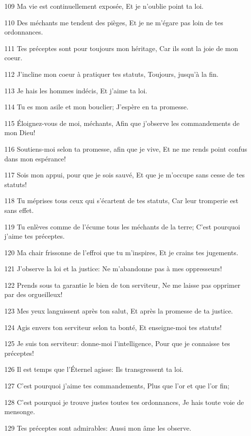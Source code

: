 \par 109 Ma vie est continuellement exposée, Et je n'oublie point ta loi.
\par 110 Des méchants me tendent des pièges, Et je ne m'égare pas loin de tes ordonnances.
\par 111 Tes préceptes sont pour toujours mon héritage, Car ils sont la joie de mon coeur.
\par 112 J'incline mon coeur à pratiquer tes statuts, Toujours, jusqu'à la fin.
\par 113 Je hais les hommes indécis, Et j'aime ta loi.
\par 114 Tu es mon asile et mon bouclier; J'espère en ta promesse.
\par 115 Éloignez-vous de moi, méchants, Afin que j'observe les commandements de mon Dieu!
\par 116 Soutiens-moi selon ta promesse, afin que je vive, Et ne me rends point confus dans mon espérance!
\par 117 Sois mon appui, pour que je sois sauvé, Et que je m'occupe sans cesse de tes statuts!
\par 118 Tu méprises tous ceux qui s'écartent de tes statuts, Car leur tromperie est sans effet.
\par 119 Tu enlèves comme de l'écume tous les méchants de la terre; C'est pourquoi j'aime tes préceptes.
\par 120 Ma chair frissonne de l'effroi que tu m'inspires, Et je crains tes jugements.
\par 121 J'observe la loi et la justice: Ne m'abandonne pas à mes oppresseurs!
\par 122 Prends sous ta garantie le bien de ton serviteur, Ne me laisse pas opprimer par des orgueilleux!
\par 123 Mes yeux languissent après ton salut, Et après la promesse de ta justice.
\par 124 Agis envers ton serviteur selon ta bonté, Et enseigne-moi tes statuts!
\par 125 Je suis ton serviteur: donne-moi l'intelligence, Pour que je connaisse tes préceptes!
\par 126 Il est temps que l'Éternel agisse: Ils transgressent ta loi.
\par 127 C'est pourquoi j'aime tes commandements, Plus que l'or et que l'or fin;
\par 128 C'est pourquoi je trouve justes toutes tes ordonnances, Je hais toute voie de mensonge.
\par 129 Tes préceptes sont admirables: Aussi mon âme les observe.
